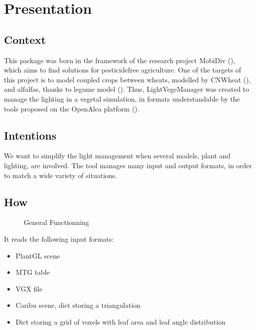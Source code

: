 \documentclass[letterpaper,10pt,english]{sphinxmanual}
\let\sphinxpxdimen\pdfpxdimen\else\newdimen\sphinxpxdimen
\begin{document}
\section{Presentation}
\label{\detokenize{presentation:presentation}}\label{\detokenize{presentation:id1}}\label{\detokenize{presentation::doc}}

\subsection{Context}
\label{\detokenize{presentation:context}}
\sphinxAtStartPar
This package was born in the framework of the research project MobiDiv (), which aims to find solutions for pesticide\sphinxhyphen{}free agriculture.
One of the targets of this project is to model coupled crops between wheats, modelled by CN\sphinxhyphen{}Wheat (), and alfalfas, thanks to l\sphinxhyphen{}egume model ().
Thus, LightVegeManager was created to manage the lighting in a vegetal simulation, in formats understandable by the tools proposed on the OpenAlea platform ().


\subsection{Intentions}
\label{\detokenize{presentation:intentions}}
\sphinxAtStartPar
We want to simplify the light management when several models, plant and lighting, are involved.
The tool manages many input and output formats, in order to match a wide variety of situations.


\subsection{How}
\label{\detokenize{presentation:how}}
\begin{figure}[htbp]
\centering
\capstart

\noindent\sphinxincludegraphics[width=2480\sphinxpxdimen,height=1319\sphinxpxdimen]{{how}.png}
\caption{General Functionning}\label{\detokenize{presentation:id2}}\end{figure}

\sphinxAtStartPar
It reads the following input formats:
\begin{itemize}
\item {} 
\sphinxAtStartPar
PlantGL scene

\item {} 
\sphinxAtStartPar
MTG table

\item {} 
\sphinxAtStartPar
VGX file

\item {} 
\sphinxAtStartPar
Caribu scene, dict storing a triangulation

\item {} 
\sphinxAtStartPar
Dict storing a grid of voxels with leaf area and leaf angle distribution

\end{itemize}
\end{document}

